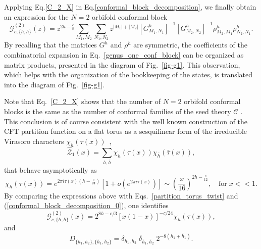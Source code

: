 \documentclass[a4paper,11pt]{article}
\begin{document}
Applying Eq.\eqref{C_2_X} in Eq.\eqref{conformal_block_decomposition}, we finally obtain an 
expression for the $N=2$ orbifold conformal block
\begin{equation}\label{genus_one_conf_block}
 \mathcal{G}_{c, \{h,h\}}^{(2)}(z)=z^{2h-\frac{c}{8}}\sum_{M_1, M_2}\sum_{N_1, N_2}
 z^{|M_1|+|M_2|}[G^{h}_{M_1,N_1}]^{-1}[G^{h}_{ M_2,N_2}]^{-1}
 \rho^h_{M_2,M_1}\rho^h_{N_2,N_1}.
\end{equation}
By recalling that the matrices $G^h$ and $\rho^h$ are symmetric, the coefficients of the combinatorial 
expansion in Eq.~\eqref{genus_one_conf_block} can be organized as matrix products, presented in the diagram 
of Fig.~\ref{fig-g1}. This observation, which helps with the organization of the bookkeeping of the states, 
is translated into the diagram of Fig.~\ref{fig-g1}.

Note that Eq.~\eqref{C_2_X} shows that the number of $N=2$ orbifold conformal blocks is the same as the number
of conformal families of the seed theory $\mathcal{C}$ . This conclusion is of course consistent with
the well known construction of the CFT partition function on a flat torus as a sesquilinear form of the
irreducible Virasoro characters $\chi_{h}(\tau(x))$~\cite{Cappelli, Cappelli2},
\begin{equation}
\mathcal{\hat{Z}}_1(x) = \sum_{h,\bar{h}} \chi_{h}(\tau(x)) \chi_{\bar{h}}(\bar{\tau}(x)),
\end{equation}
that behave asymptotically as
\begin{equation}
\chi_{h}(\tau(x)) = e^{2\pi i \tau(x)\left(h-\frac{c}{24}\right)}\left[1+ o\left(e^{2\pi i \tau(x)}\right)\right] \sim \left(\frac{x}{16}\right)^{ 2 h-\frac{c}{12}}, \quad \text{for}\; x<<1.
\end{equation}
 By comparing the expressions above with Eqs.~\eqref{partition_torus_twist} and (\ref{conformal_block_decomposition_0}), one identifies 
\begin{equation}\label{character_conf_block}
\mathcal{G}_{c,\{h, h\}}^{(2)}(x)=2^{8h-c/3}[x(1-x)]^{-c/24}\chi_{h}(\tau(x)),
\end{equation}
and 
\begin{equation}
 D_{\{ h_1, h_2 \}, \{ \bar{h}_1,\bar{h}_2\} } =\delta_{h_1,h_2}\;\delta_{\bar{h}_1,\bar{h}_2} \;2^{-8 (h_1+\bar{h}_1)}.
\end{equation}
\end{document}
